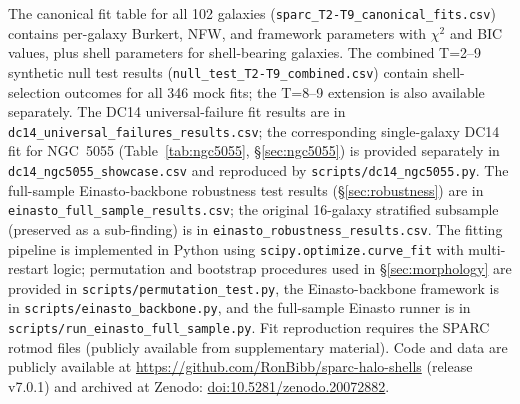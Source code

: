 The canonical fit table for all 102 galaxies (\texttt{sparc\_T2-T9\_canonical\_fits.csv}) contains per-galaxy Burkert, NFW, and framework parameters with $\chi^2$ and BIC values, plus shell parameters for shell-bearing galaxies. The combined T=2--9 synthetic null test results (\texttt{null\_test\_T2-T9\_combined.csv}) contain shell-selection outcomes for all 346 mock fits; the T=8--9 extension is also available separately. The DC14 universal-failure fit results are in \texttt{dc14\_universal\_failures\_results.csv}; the corresponding single-galaxy DC14 fit for NGC~5055 (Table~\ref{tab:ngc5055}, \S\ref{sec:ngc5055}) is provided separately in \texttt{dc14\_ngc5055\_showcase.csv} and reproduced by \texttt{scripts/dc14\_ngc5055.py}. The full-sample Einasto-backbone robustness test results (\S\ref{sec:robustness}) are in \texttt{einasto\_full\_sample\_results.csv}; the original 16-galaxy stratified subsample (preserved as a sub-finding) is in \texttt{einasto\_robustness\_results.csv}. The fitting pipeline is implemented in Python using \texttt{scipy.optimize.curve\_fit} with multi-restart logic; permutation and bootstrap procedures used in \S\ref{sec:morphology} are provided in \texttt{scripts/permutation\_test.py}, the Einasto-backbone framework is in \texttt{scripts/einasto\_backbone.py}, and the full-sample Einasto runner is in \texttt{scripts/run\_einasto\_full\_sample.py}. Fit reproduction requires the SPARC rotmod files (publicly available from \citealt{Lelli2016} supplementary material). Code and data are publicly available at \url{https://github.com/RonBibb/sparc-halo-shells} (release v7.0.1) and archived at Zenodo: \href{https://doi.org/10.5281/zenodo.20072882}{doi:10.5281/zenodo.20072882}.

